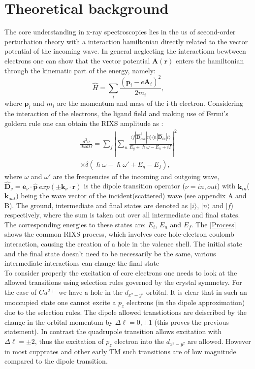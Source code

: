 \documentclass[twocolumn,amsmath,superscriptaddress,amssymb]{revtex4-1}
\newcommand{\vect}[1]{\boldsymbol{#1}}
\begin{document}
\section{Theoretical background}
The core understanding in x-ray spectroscopies lies in the us of sceond-order perturbation theory with a interaction hamiltonian directly related to the vector potential of the incoming wave. In general neglecting the interactionn bewtween electrons one can show that the vector potential $\vect{A}(\vect{r})$ enters the hamiltonian through the kinematic part of the energy, namely:
\begin{equation}\label{eq: hamil}
\hat{H} = \sum_i\frac{(\vect{p}_i-e\vect{A}_i)^2}{2m_i},
\end{equation}
%
\noindent where $\vect{p}_i$ and $m_i$ are the momentum and mass of the i-th electron. Considering the interaction of the electrons, the ligand field and making use of Fermi's goldern rule one can obtain the RIXS amplitude as \cite{PasqualephD}:
%
\begin{equation}\label{eq: Kramer Heisenberg}
\begin{split}
\frac{d^2\sigma}{d\omega d\Omega}=\sum_f\left|\sum_n\frac{\langle f|\hat{\vect{D}}_{out}^{\dag}|n\rangle \langle n|\hat{\vect{D}}_{in}|i\rangle}{E_g+\hslash\omega-E_n+i\Gamma}\right|^2\\
\times\delta(\hslash\omega-\hslash\omega'+E_g-E_f),
\end{split}
\end{equation}
%
\noindent where $\omega$ and $\omega'$ are the frequencies of the incoming and outgoing wave, $\hat{\vect{D}}_\nu = \vect{e}_\nu\cdot\hat{\vect{p}}~exp(\pm \vect{k}_\nu \cdot \vect{r})$ is the dipole transition operator ($\nu=in,out$) with $\vect{k}_{in}$($\vect{k}_{out}$) being the wave vector of the incident(scattered) wave (see appendix A and B). The ground, intermediate and final states are denoted as $|i\rangle$, $|n\rangle$ and $|f\rangle$ respectively, where the sum is taken out over all intermediate and final states. The corresponding energies to these states are: $E_i$, $E_n$ and $E_f$. The \ref{Process} shows the common RIXS process, which involves core hole-electron coulomb interaction, causing the creation of a hole in the valence shell. The initial state and the final state doesn't need to be necessarily be the same, various intermediate interactions can change the final state\\
\indent To consider properly the excitation of core electrons one needs to look at the allowed transitions using selection rules governed by the crystal symmetry. For the case of $Cu^{2+}$ we have a hole in the $d_{x^2-y^2}$ orbital. It is clear that in such an unoccupied state one cannot excite a $p_z$ electrons (in the dipole approximation) due to the selection rules. The dipole allowed transtiotions are deiscribed by the change in the orbital momentum by $\Delta\ell= 0,\pm1$ (this proves the previous statement). In contrast the quadrupole transition allows excitation with $\Delta\ell= \pm2$, thus the excitation of $p_z$ electron into the $d_{x^2-y^2}$ are allowed. However in most cupprates and other early TM such transitions are of low magnitude compared to the dipole transition.\\
\end{document}
